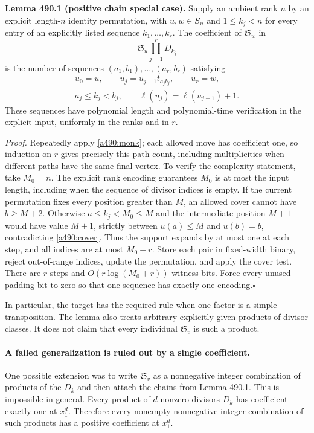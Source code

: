 \documentclass[11pt]{article}
\begin{document}
\textbf{Lemma 490.1 (positive chain special case).}
Supply an ambient rank $n$ by an explicit length-$n$ identity permutation,
with $u,w\in S_n$ and $1\leq k_j<n$ for every entry of an explicitly
listed sequence $k_1,\ldots,k_r$. The coefficient of
$\mathfrak S_w$ in
\[
                      \mathfrak S_u\prod_{j=1}^r D_{k_j}
\]
is the number of sequences $(a_1,b_1),\ldots,(a_r,b_r)$ satisfying
\[
\begin{gathered}
 u_0=u,\qquad u_j=u_{j-1}t_{a_jb_j},\qquad u_r=w,\\
 a_j\leq k_j<b_j,\qquad \ell(u_j)=\ell(u_{j-1})+1.
\end{gathered}
\]
These sequences have polynomial length and polynomial-time verification in
the explicit input, uniformly in the ranks and in $r$.

\emph{Proof.} Repeatedly apply \eqref{a490:monk}; each allowed move has
coefficient one, so induction on $r$ gives precisely this path count,
including multiplicities when different paths have the same final vertex.
To verify the complexity statement, take $M_0=n$. The explicit rank
encoding guarantees $M_0$ is at most the input length, including when the
sequence of divisor indices is empty.
If the current permutation fixes every position greater than $M$, an
allowed cover cannot have $b\geq M+2$. Otherwise $a\leq k_j<M_0\leq M$
and the intermediate position $M+1$ would have value $M+1$, strictly
between $u(a)\leq M$ and $u(b)=b$, contradicting \eqref{a490:cover}.
Thus the support expands by at most one at each step, and all indices are
at most $M_0+r$. Store each pair in fixed-width binary, reject out-of-range
indices, update the permutation, and apply the cover test. There are $r$
steps and $O(r\log(M_0+r))$ witness bits. Force every unused padding bit
to zero so that one sequence has exactly one encoding.\hfill$\square$

In particular, the target has the required rule when one factor is a simple
transposition. The lemma also treats arbitrary explicitly given products
of divisor classes. It does not claim that every individual
$\mathfrak S_v$ is such a product.

\paragraph{A failed generalization is ruled out by a single coefficient.}
One possible extension was to write $\mathfrak S_v$ as a nonnegative
integer combination of products of the $D_k$ and then attach the chains
from Lemma 490.1. This is impossible in general. Every product of $d$
nonzero divisors $D_k$ has coefficient exactly one at $x_1^d$. Therefore
every nonempty nonnegative integer combination of such products has a
positive coefficient at $x_1^d$.
\end{document}
